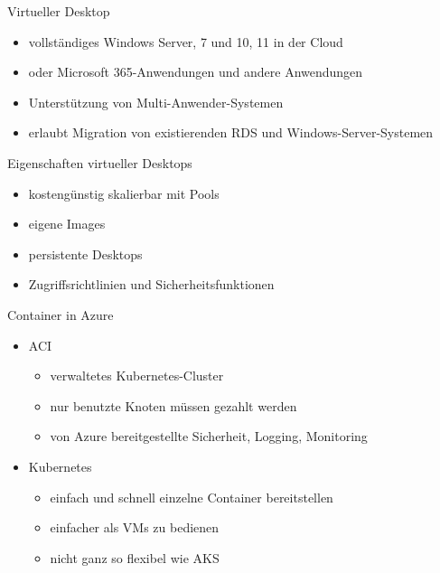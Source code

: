 \begin{flashcard}[]{Virtueller Desktop}
  \begin{itemize}
    \item vollständiges Windows Server, 7 und 10, 11 in der Cloud
    \item oder Microsoft 365-Anwendungen und andere Anwendungen
    \item Unterstützung von Multi-Anwender-Systemen
    \item erlaubt Migration von existierenden RDS und Windows-Server-Systemen
  \end{itemize}
\end{flashcard}

\begin{flashcard}[]{Eigenschaften virtueller Desktops}
  \begin{itemize}
    \item kostengünstig skalierbar mit Pools
    \item eigene Images
    \item persistente Desktops
    \item Zugriffsrichtlinien und Sicherheitsfunktionen
  \end{itemize}
\end{flashcard}


\begin{flashcard}[]{Container in Azure}
  \begin{itemize}
    \item ACI
      \begin{itemize}
        \item verwaltetes Kubernetes-Cluster
        \item nur benutzte Knoten müssen gezahlt werden
        \item von Azure bereitgestellte Sicherheit, Logging, Monitoring
      \end{itemize}
    \item Kubernetes
      \begin{itemize}
        \item einfach und schnell einzelne Container bereitstellen
        \item einfacher als VMs zu bedienen
        \item nicht ganz so flexibel wie AKS
      \end{itemize}
  \end{itemize}
\end{flashcard}

